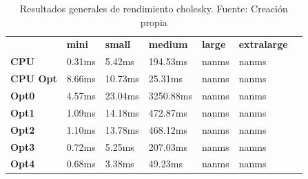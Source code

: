 \begin{table}[H]
    \centering
    \begin{tabular}{lllllll}
    \rowcolor[HTML]{DAE8FC} \ &  \textbf{mini} &  \textbf{small} &  \textbf{medium} &  \textbf{	large} &  \textbf{	extralarge} \\
    \cellcolor[HTML]{DAE8FC} \textbf{CPU} & 0.31ms & 5.42ms & 194.53ms & 	nanms & 	nanms \\
    \rowcolor[HTML]{EFEFEF} \cellcolor[HTML]{DAE8FC} \textbf{CPU Opt} & 8.66ms & 10.73ms & 25.31ms & 	nanms & 	nanms \\
    \cellcolor[HTML]{DAE8FC} \textbf{Opt0} & 4.57ms & 23.04ms & 3250.88ms & 	nanms & 	nanms \\
    \rowcolor[HTML]{EFEFEF} \cellcolor[HTML]{DAE8FC} \textbf{Opt1} & 1.09ms & 14.18ms & 472.87ms & 	nanms & 	nanms \\
    \cellcolor[HTML]{DAE8FC} \textbf{Opt2} & 1.10ms & 13.78ms & 468.12ms & 	nanms & 	nanms \\
    \rowcolor[HTML]{EFEFEF} \cellcolor[HTML]{DAE8FC} \textbf{Opt3} & 0.72ms & 5.25ms & 207.03ms & 	nanms & 	nanms \\
    \cellcolor[HTML]{DAE8FC} \textbf{Opt4} & 0.68ms & 3.38ms & 49.23ms & 	nanms & 	nanms \\
    \end{tabular}
    \caption[Resultados generales de rendimiento cholesky]{{Resultados generales de rendimiento cholesky. Fuente: Creación propia}}
    \label{table_global_cholesky_PerformanceResults_data}
\end{table}
